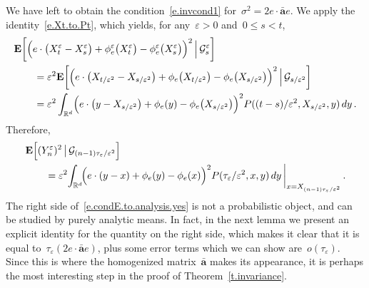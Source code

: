 \documentclass[11pt]{article} %
\numberwithin{equation}{section}
\theoremstyle{definition}
\newcommand*{\Rd}{\ensuremath{\mathbb{R}^d}}
\newcommand{\eps}{\varepsilon}
\newcommand{\ep}{\eps}
\renewcommand{\a}{\mathbf{a}}
\newcommand{\ahom}{\bar{\a}}
\begin{document}
We have left to obtain the condition~\eqref{e.invcond1} for~$\sigma^2 = 2e \cdot \ahom e$. 
We apply the identity~\eqref{e.Xt.to.Pt}, which yields, for any~$\ep>0$ and~$0\leq s<t$, 
\begin{align*}
\lefteqn{ 
\mathbf{E} 
\biggl[ 
\Bigl(
e \cdot \bigl( X^{\ep}_{t} - X^{\ep}_{s} \bigr)  
+ 
\phi^\ep_{e}\bigl(X^{\ep}_{t}\bigr) - \phi^\ep_{e}\bigl(X^{\ep}_{s}\bigr)
\Bigr)^2
\, \Bigl|\, \mathcal{G}^\ep_s
\biggr]
} \qquad & 
\\ & 
=
\ep^2 
\mathbf{E} 
\biggl[ 
\Bigl(
e \cdot \bigl( X_{t/\ep^2} - X_{s/\ep^2} \bigr)  
+ 
\phi_{e}\bigl(X_{t/\ep^2}\bigr) - \phi_{e}\bigl(X_{s/\ep^2}\bigr)
\Bigr)^2
\, \Bigl|\, \mathcal{G}_{s/\ep^2}
\biggr]
\\ &  
=
\ep^2 \int_{\Rd} 
\Bigl( e\cdot \bigl(y- X_{s/\ep^2}\bigr) + \phi_e(y) - \phi_e\bigl(X_{s/\ep^2}\bigr) \Bigr)^2
P( (t-s)/\ep^2 , X_{s/\ep^2} ,y)\,dy 
\,.
\end{align*}
Therefore, 
\begin{align}
\label{e.condE.to.analysis.yes}
\lefteqn{
\mathbf{E} \Bigl[ (Y_{n}^\ep )^2 \, \big\vert \, \mathcal{G}_{(n-1)\tau_\ep/\ep^2} \Bigr] 
} \qquad & 
\notag \\ & 
=
\ep^2 
\! \int_{\Rd} \!
\Bigl( e\cdot (y- x) + \phi_e(y) - \phi_e(x) \Bigr)^2
P( \tau_\ep/\ep^2, x, y)\,dy \,
\biggr\vert_{x=X_{(n-1)\tau_\ep/\ep^2} }
\,.
\end{align}
The right side of~\eqref{e.condE.to.analysis.yes} is not a probabilistic object, and can be studied  by purely analytic means. In fact, in the next lemma we present an explicit identity for the quantity on the right side, which makes it clear that it is equal to~$\tau_\ep (2e\cdot \ahom e)$, plus some error terms which we can show are~$o(\tau_\ep)$. 
Since this is where the homogenized matrix~$\ahom$ makes its appearance, it is perhaps the most interesting step in the proof of Theorem~\ref{t.invariance}.
\end{document}
